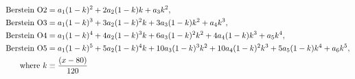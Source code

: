 \begin{equation}
\label{eq:bernstein}
\begin{aligned}
\textnormal{Berstein O2} &= a_1(1-k)^2 + 2a_2(1-k)k + a_3k^2, \\
\textnormal{Berstein O3} &= a_1(1-k)^3 + 3a_2(1-k)^2k + 3a_3(1-k)k^2 + a_4k^3, \\
\textnormal{Berstein O4} &= a_1(1-k)^4 + 4a_2(1-k)^3k + 6a_3(1-k)^2k^2 + 4a_4(1-k)k^3 + a_5k^4,\\
\textnormal{Berstein O5} &= a_1(1-k)^5 + 5a_2(1-k)^4k + 10a_3(1-k)^3k^2 + 10a_4(1-k)^2k^3 + 5a_5(1-k)k^4 +a_6k^5, \\
\textnormal{where } k &\equiv \frac{(x-80)}{120}
\end{aligned}
\end{equation}

\clearpage
